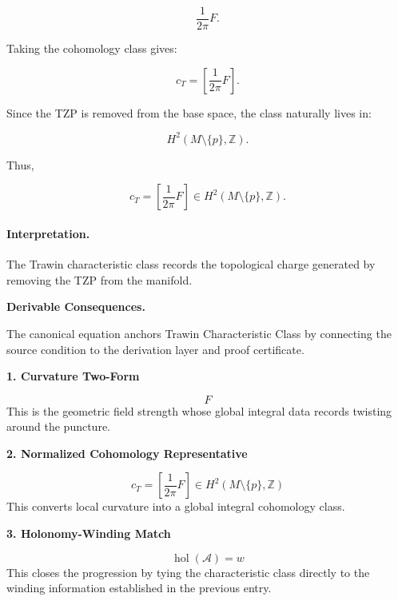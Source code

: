 \begin{equation}
\frac{1}{2\pi}F .
\end{equation}

Taking the cohomology class gives:

\begin{equation}
c_T
=
\left[
\frac{1}{2\pi}F
\right].
\end{equation}

Since the TZP is removed from the base space, the class naturally lives in:

\begin{equation}
H^2(M\setminus\{p\},\mathbb{Z}) .
\end{equation}

Thus,

\begin{equation}
\boxed{
c_T
=
\left[
\frac{1}{2\pi}F
\right]
\in
H^2(M\setminus\{p\},\mathbb{Z}) .
}
\end{equation}

\paragraph{Interpretation.}
The Trawin characteristic class records the topological charge generated by removing the TZP from the manifold.

\par\vspace{0.35em}
\noindent\textbf{Derivable Consequences.}\quad
\begingroup
\footnotesize
\raggedright
The canonical equation anchors Trawin Characteristic Class by connecting the source condition to the derivation layer and proof certificate.
\par\endgroup

\noindent\textbf{1. Curvature Two-Form}\par
\[
F
\]
\noindent This is the geometric field strength whose global integral data records twisting around the puncture.\par
\noindent\textbf{2. Normalized Cohomology Representative}\par
\[
c_{T}
=
\left[\frac{1}{2\pi}F\right]
\in
H^{2}(M\setminus\{p\},\mathbb{Z})
\]
\noindent This converts local curvature into a global integral cohomology class.\par
\noindent\textbf{3. Holonomy-Winding Match}\par
\[
\operatorname{hol}(\mathcal{A}) = w
\]
\noindent This closes the progression by tying the characteristic class directly to the winding information established in the previous entry.\par


